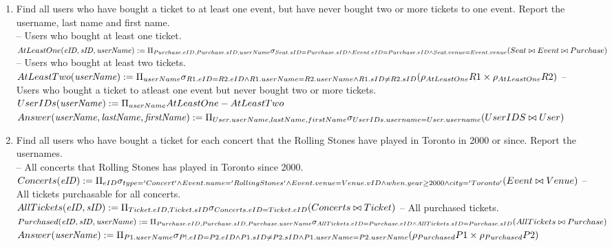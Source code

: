 \documentclass{article}
\newcommand{\var}[1]{\mathit{#1}}
\begin{document}
\begin{enumerate}
\item   %
Find all users who have bought a ticket to at least one event,
but have never bought two or more tickets to one event.
Report the username, last name and first name.\\[5pt]
-- Users who bought at least one ticket. \\[5pt]
{ \large
$
AtLeastOne(\var{eID, sID, userName}) := 
	\Pi_{Purchase.eID, Purchase.sID, userName} \\
	\sigma_{
		Seat.sID=Purchase.sID \wedge
		Event.eID=Purchase.eID \wedge
		Seat.venue=Event.venue }
	(Seat \bowtie Event \bowtie Purchase) \\[10pt]
$
}
-- Users who bought at least two tickets. \\[5pt]
{ \large
$
AtLeastTwo(\var{userName}) := 
	\Pi_{userName} 
	\sigma_{
		R1.eID=R2.eID \wedge
		R1.userName=R2.userName \wedge
		R1.sID \neq R2.sID
		}\\
	(\rho_{AtLeastOne}R1 \times \rho_{AtLeastOne}R2)\\[10pt]
$}
-- Users who bought a ticket to atleast one event but never bought two or more tickets. \\[5pt]
{ \large
$
UserIDs(\var{userName}) := 
	\Pi_{userName} 
	AtLeastOne - AtLeastTwo\\[10pt]
$
$
Answer(\var{userName, lastName, firstName}) := \\
	\Pi_{User.userName, lastName, firstName} 
	\sigma_{
		UserIDs.username=User.username 
		}
	(UserIDS \bowtie User) \\[10pt]
$
}
\item   %
Find all users who have bought a ticket for each concert that the Rolling Stones have played in Toronto in 2000 or since. Report the usernames. \\[5pt]
-- All concerts that Rolling Stones has played in Toronto since 2000. \\[5pt]
{ \large
$
Concerts(\var{eID}) := \\
	\Pi_{eID} 
	\sigma_{
		type='Concert' \wedge
		Event.name='RollingStones' \wedge
		Event.venue=Venue.vID \wedge
		when.year \ge 2000 \wedge
		city='Toronto' }\\
	(Event \bowtie Venue) \\[10pt]
$
}
-- All tickets purchasable for all concerts. \\[5pt]
{ \large
$
AllTickets(\var{eID, sID}) := 
	\Pi_{Ticket.eID, Ticket.sID} 
	\sigma_{
		Concerts.eID=Ticket.eID}
	(Concerts \bowtie Ticket)\\[10pt]
$
}
-- All purchased tickets. \\[5pt]
{ \large
$
Purchased(\var{eID, sID, userName}) := 
	\Pi_{Purchase.eID, Purchase.sID, Purchase.userName} \\
	\sigma_{
		AllTickets.eID=Purchase.eID \wedge
		AllTickets.sID=Purchase.sID
		} 
	(All Tickets \bowtie Purchase ) \\[10pt]
$
$
Answer(\var{userName}) := \\
	\Pi_{P1.userName} 
	\sigma_{
		P!.eID=P2.eID \wedge
		P1.sID \neq P2.sID \wedge
		P1.userName=P2.userName
		}
	(\rho_{Purchased}P1 \times \rho_{Purchased}P2) \\[50pt]
$
}


\end{enumerate}
\end{document}
